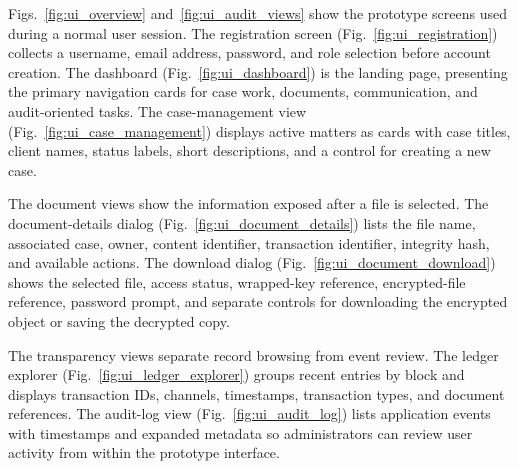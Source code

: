 \documentclass{ieeeaccess}
\begin{document}
Figs.~\ref{fig:ui_overview} and~\ref{fig:ui_audit_views} show the
prototype screens used during a normal user session. The registration
screen (Fig.~\ref{fig:ui_registration}) collects a username, email
address, password, and role selection before account creation. The
dashboard (Fig.~\ref{fig:ui_dashboard}) is the landing page, presenting
the primary navigation cards for case work, documents, communication,
and audit-oriented tasks. The case-management view
(Fig.~\ref{fig:ui_case_management}) displays active matters as cards with
case titles, client names, status labels, short descriptions, and a
control for creating a new case.

The document views show the information exposed after a file is selected.
The document-details dialog (Fig.~\ref{fig:ui_document_details}) lists the
file name, associated case, owner, content identifier, transaction
identifier, integrity hash, and available actions. The download dialog
(Fig.~\ref{fig:ui_document_download}) shows the selected file, access
status, wrapped-key reference, encrypted-file reference, password prompt,
and separate controls for downloading the encrypted object or saving the
decrypted copy.

The transparency views separate record browsing from event review. The
ledger explorer (Fig.~\ref{fig:ui_ledger_explorer}) groups recent entries
by block and displays transaction IDs, channels, timestamps, transaction
types, and document references. The audit-log view
(Fig.~\ref{fig:ui_audit_log}) lists application events with timestamps and
expanded metadata so administrators can review user activity from within
the prototype interface.
\end{document}
